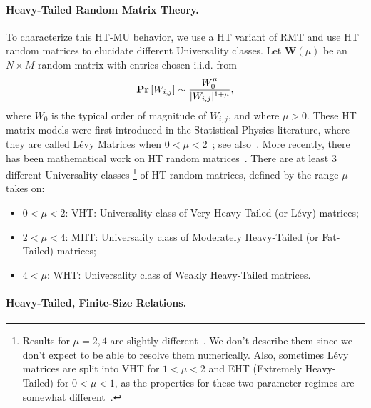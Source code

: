 \paragraph{Heavy-Tailed Random Matrix Theory.} 
To characterize this HT-MU behavior, we use a HT variant of RMT and use HT random matrices to elucidate different Universality classes.
Let $\mathbf{W}(\mu)$ be an $N \times M$ random matrix with entries chosen i.i.d. from
\begin{equation}
\mbox{}{\bf{Pr}}\left[ W_{i,j} \right] \sim \frac{W_{0}^{\mu}}{|W_{i,j}|^{1+\mu}}  ,
\label{eqn:ht_dstbn}
\end{equation}
where $W_{0}$ is the typical order of magnitude of $W_{i,j}$, and where $\mu>0$. 
These HT matrix models were first introduced in the Statistical Physics literature, where they are called L\'evy Matrices when $0<\mu<2$~\cite{PB94}; see also~\cite{BM97,BJNx01_TR,BJNx06_TR,heavytails2007}.
More recently, there has been mathematical work on HT random matrices~\cite{AG08,AAP09,BJ09_TR,DPS14,AT16}.
There are at least 3 different Universality classes%
\footnote{Results for $\mu=2,4$ are slightly different~\cite{SornetteBook,BouchaudPotters03}.  We don't describe them since we don't expect to be able to resolve them numerically.  Also, sometimes L\'evy matrices are split into VHT for $1<\mu<2$ and EHT (Extremely Heavy-Tailed) for $0<\mu<1$, as the properties for these two parameter regimes are somewhat different~\cite{SornetteBook,BouchaudPotters03}.}
of HT random matrices, defined by the range $\mu$ takes on:
\begin{itemize}
\item $0<\mu<2$: VHT: Universality class of Very Heavy-Tailed (or L\'evy) matrices;
\item $2<\mu<4$: MHT: Universality class of Moderately Heavy-Tailed (or Fat-Tailed) matrices;
\item $4<\mu$: WHT: Universality class of Weakly Heavy-Tailed matrices.
\end{itemize}


\paragraph{Heavy-Tailed, Finite-Size Relations.}

